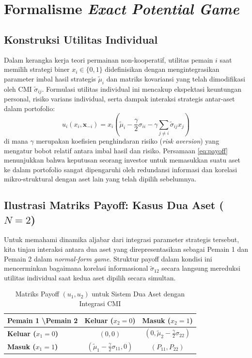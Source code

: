 \section{Formalisme \textit{Exact Potential Game}}

\subsection{Konstruksi Utilitas Individual}
Dalam kerangka kerja teori permainan non-kooperatif, utilitas pemain $i$ saat memilih strategi biner $x_i \in \{0, 1\}$ didefinisikan dengan mengintegrasikan parameter imbal hasil strategis $\tilde{\mu}_i$ dan matriks kovariansi yang telah dimodifikasi oleh CMI $\tilde{\sigma}_{ij}$. Formulasi utilitas individual ini mencakup ekspektasi keuntungan personal, risiko varians individual, serta dampak interaksi strategis antar-aset dalam portofolio:
\begin{equation} \label{eq:payoff}
    u_i(x_i, \mathbf{x}_{-i}) = x_i \left( \tilde{\mu}_i - \frac{\gamma}{2} \sigma_{ii} - \gamma \sum_{j \neq i} \tilde{\sigma}_{ij} x_j \right)
\end{equation}
di mana $\gamma$ merupakan koefisien penghindaran risiko (\textit{risk aversion}) yang mengatur bobot relatif antara imbal hasil dan risiko. Persamaan \eqref{eq:payoff} menunjukkan bahwa keputusan seorang investor untuk memasukkan suatu aset ke dalam portofolio sangat dipengaruhi oleh redundansi informasi dan korelasi mikro-struktural dengan aset lain yang telah dipilih sebelumnya.

\subsection{Ilustrasi Matriks Payoff: Kasus Dua Aset ($N=2$)}
Untuk memahami dinamika aljabar dari integrasi parameter strategis tersebut, kita tinjau interaksi antara dua aset yang direpresentasikan sebagai Pemain 1 dan Pemain 2 dalam \textit{normal-form game}. Struktur payoff dalam kondisi ini mencerminkan bagaimana korelasi informasional $\tilde{\sigma}_{12}$ secara langsung mereduksi utilitas individual saat kedua aset dipilih secara simultan.

\begin{table}[h]
\centering
\renewcommand{\arraystretch}{2.0}
\begin{tabular}{|l|c|c|}
\hline
\textbf{Pemain 1 \textbackslash Pemain 2} & \textbf{Keluar ($x_2=0$)} & \textbf{Masuk ($x_2=1$)} \\ \hline
\textbf{Keluar ($x_1=0$)} & $(0, 0)$ & $(0, \tilde{\mu}_2 - \frac{\gamma}{2}\sigma_{22})$ \\ \hline
\textbf{Masuk ($x_1=1$)} & $(\tilde{\mu}_1 - \frac{\gamma}{2}\sigma_{11}, 0)$ & $(P_{11}, P_{22})$ \\ \hline
\end{tabular}
\caption{Matriks Payoff $(u_1, u_2)$ untuk Sistem Dua Aset dengan Integrasi CMI}
\end{table}

